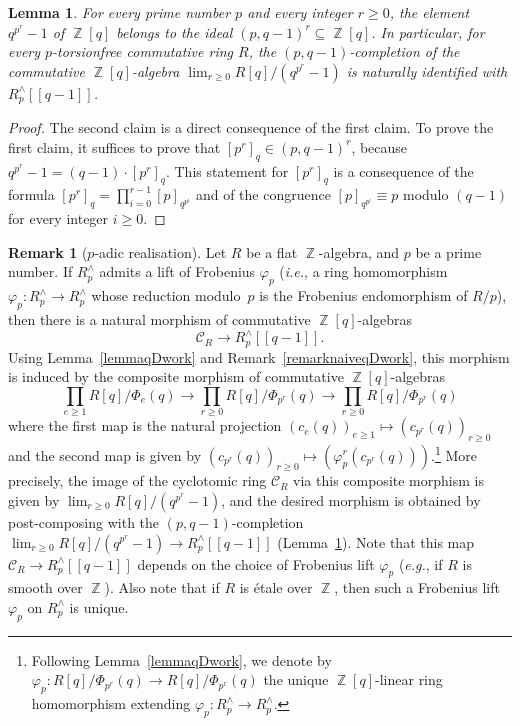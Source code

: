 \documentclass[10pt,twoside]{scrarticle}
\newlength{\mar} \setlength{\mar}{1cm}%
\newlength{\len}
\newtheorem{lemma}[theorem]{Lemma}
\theoremstyle{definition}
\newtheorem{remark}[theorem]{Remark}
\DeclareMathOperator{\Z}{\mathbb{Z}}
\renewcommand{\ge}{\geqslant}
\numberwithin{equation}{theorem}
\begin{document}
\begin{lemma}\label{lemmapq-1completion}
    For every prime number $p$ and every integer $r \ge 0$, the element $q^{p^r}-1$ of $\Z[q]$ belongs to the ideal $(p,q-1)^r \subseteq \Z[q]$. In particular, for every $p$-torsionfree commutative ring $R$, the $(p,q-1)$-completion of the commutative $\Z[q]$-algebra $\lim_{r \ge 0} R[q]/(q^{p^r}-1)$ is naturally identified with $R^\wedge_p[\![q-1]\!]$.
\end{lemma}

\begin{proof}
    The second claim is a direct consequence of the first claim. To prove the first claim, it suffices to prove that $[p^r]_q \in (p,q-1)^r$, because $q^{p^r}-1=(q-1) \cdot [p^r]_q$. This statement for $[p^r]_q$ is a consequence of the formula $[p^r]_q = \prod_{i=0}^{r-1} [p]_{q^{p^i}}$ and of the congruence $[p]_{q^{p^i}} \equiv p$ modulo $(q-1)$ for every integer $i \ge 0$.
\end{proof}

\begin{remark}[$p$-adic realisation]\label{remarkpadicrealisationcyclotomic}
    Let $R$ be a flat $\Z$-algebra, and $p$ be a prime number. If $R^\wedge_p$ admits a lift of Frobenius $\varphi_p$ (\textit{i.e.}, a ring homomorphism $\varphi_p : R^\wedge_p \rightarrow R^\wedge_p$ whose reduction modulo~$p$ is the Frobenius endomorphism of $R/p$), then there is a natural morphism of commutative $\Z[q]$\nobreakdash-algebras
    $$\mathcal{C}_R \longrightarrow R^\wedge_p[\![q-1]\!].$$
    Using Lemma~\ref{lemmaqDwork} and Remark~\ref{remarknaiveqDwork}, this morphism is induced by the composite morphism of commutative $\Z[q]$-algebras
    $$\prod_{e \ge 1} R[q]/\Phi_e(q) \longrightarrow \prod_{r \ge 0} R[q]/\Phi_{p^r}(q) \longrightarrow \prod_{r \ge 0} R[q]/\Phi_{p^r}(q)$$
    where the first map is the natural projection $(c_e(q))_{e \ge 1} \mapsto (c_{p^r}(q))_{r \ge 0}$ and the second map is given by $(c_{p^r}(q))_{r \ge 0} \mapsto (\varphi_p^r(c_{p^r}(q)))$.\footnote{Following Lemma~\ref{lemmaqDwork}, we denote by $\varphi_p : R[q]/\Phi_{p^r}(q) \rightarrow R[q]/\Phi_{p^r}(q)$ the unique $\Z[q]$-linear ring homomorphism extending $\varphi_p : R^\wedge_p \rightarrow R^\wedge_p$.} More precisely, the image of the cyclotomic ring $\mathcal{C}_{R}$ via this composite morphism is given by $\lim_{r \ge 0} R[q]/(q^{p^r}-1)$, and the desired morphism is obtained by post-composing with the $(p,q-1)$-completion $\lim_{r \ge 0} R[q]/(q^{p^r}-1) \rightarrow R^\wedge_p[\![q-1]\!]$ (Lemma~\ref{lemmapq-1completion}). 
    Note that this map $\mathcal{C}_R \rightarrow R^\wedge_p[\![q-1]\!]$ depends on the choice of Frobenius lift $\varphi_p$ (\textit{e.g.}, if $R$ is smooth over $\Z$). Also note that if $R$ is étale over $\Z$, then such a Frobenius lift $\varphi_p$ on $R^\wedge_p$ is unique.
\end{remark}
\end{document}
